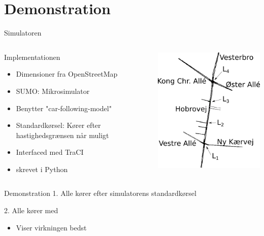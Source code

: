 \section{Demonstration}
\begin{frame}{Simulatoren}
\begin{columns}
\begin{column}{0.6\textwidth}
Implementationen
\begin{itemize}
\item Dimensioner fra OpenStreetMap
\item SUMO: Mikrosimulator
\item Benytter "car-following-model"
\item Standardkørsel: Kører efter hastighedsgrænsen når muligt
\item Interfaced med TraCI
\item \tech skrevet i Python
\end{itemize}
\end{column}

\begin{column}{0.5\textwidth}
\includegraphics[width=1\textwidth]{../images/HobrovejNy.png}
\end{column}
\end{columns}
\end{frame}

\begin{frame}{Demonstration}
1. Alle kører efter simulatorens standardkørsel
\vspace{4mm}

2. Alle kører med \tech
\begin{itemize}
\item Viser virkningen bedst
\end{itemize}
\end{frame}
